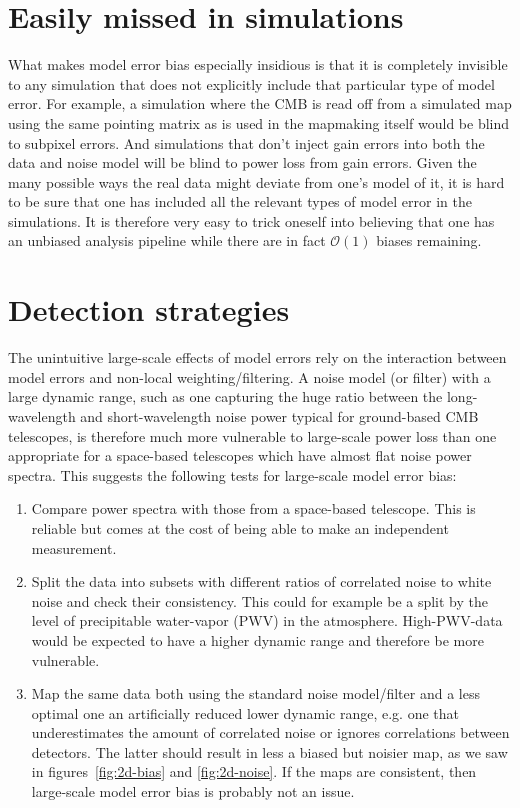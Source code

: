 \documentclass{aa}
\begin{document}
\section{Easily missed in simulations}
What makes model error bias especially insidious is that
it is completely invisible to any simulation that does not explicitly include
that particular type of model error. For example, a simulation where the CMB
is read off from a simulated map using the same pointing matrix as is used
in the mapmaking itself would be blind to subpixel errors. And simulations that
don't inject gain errors into both the data and noise model will be blind to
power loss from gain errors. Given the many
possible ways the real data might deviate from one's model of it, it is hard
to be sure that one has included all the relevant types of model error in the simulations.
It is therefore very easy to trick oneself into believing that one has an
unbiased analysis pipeline while there are in fact $\mathcal{O}(1)$ biases remaining.

\section{Detection strategies}
The unintuitive large-scale effects of model errors rely on the interaction
between model errors and non-local weighting/filtering. A noise model (or filter) with
a large dynamic range, such as one capturing the huge ratio between the long-wavelength
and short-wavelength noise power typical for ground-based CMB telescopes, is therefore
much more vulnerable to large-scale power loss than one appropriate for a
space-based telescopes which have almost flat noise power spectra. This suggests
the following tests for large-scale model error bias:
\begin{enumerate}
	\item Compare power spectra with those from a space-based telescope.
		This is reliable but comes at the cost of being able to make an independent measurement.
	\item Split the data into subsets with different ratios of correlated noise to white noise
		and check their consistency. This could for example be a split by the
		level of precipitable water-vapor (PWV) in the atmosphere. High-PWV-data
		would be expected to have a higher dynamic range and therefore be more vulnerable.
	\item Map the same data both using the standard noise model/filter and a
		less optimal one an artificially reduced lower dynamic range, e.g. one that
		underestimates the amount of correlated noise or ignores correlations between
		detectors. The latter should result in less a biased but noisier map, as we saw
		in figures~\ref{fig:2d-bias} and \ref{fig:2d-noise}.
		If the maps are consistent, then large-scale model error bias is probably not an issue.
\end{enumerate}
\end{document}
